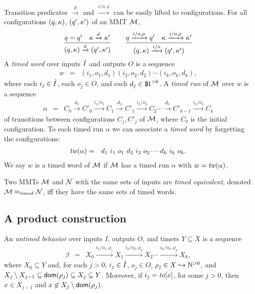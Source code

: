 Transition predicates $\xrightarrow{d}$ and $\xrightarrow{i/o, \rho}$ can be easily lifted to configurations.
For all configurations $(q, \kappa)$, $(q', \kappa')$ of an MMT ${\cal M}$,
\[
\frac{q = q' \quad \kappa \xrightarrow{d} \kappa'}{(q,\kappa) \xrightarrow{d} (q',\kappa')}
\quad\quad
  \frac{q \xrightarrow{i/o,\rho} q' \quad \kappa \xrightarrow{i/o, \rho} \kappa'}{(q,\kappa) \xrightarrow{i/o} (q',\kappa')}
\]
A \emph{timed word} over inputs $\hat{I}$ and outputs $O$ is a sequence
\begin{eqnarray*}
w & = &  (i_1, o_1, d_1) (i_2, o_2, d_2) \cdots (i_k, o_k, d_k),
\end{eqnarray*}
where each $i_j \in \hat{I}$, each $o_j \in O$, and each $d_j \in {\rm I\!R}^{> 0}$.
A \emph{timed run} of ${\cal M}$ over $w$ is a sequence 
\begin{eqnarray*}
\alpha & = & C_0 \xrightarrow{d_1} C'_0 \xrightarrow{i_1/o_1} C_1 \xrightarrow{d_2} C'_1 \xrightarrow{i_2/o_2} C_2 \cdots
\xrightarrow{d_k} C'_{k-1} \xrightarrow{i_k/o_k} C_{k}
\end{eqnarray*}
of transitions between configurations $C_j, C'_j$ of ${\cal M}$, where $C_0$ is the initial configuration.
To each timed run $\alpha$ we can associate a \emph{timed word} by forgetting the configurations:
\begin{eqnarray*}
\mathit{tw}(\alpha) & = & d_1 ~ i_1 ~ o_1 ~ d_2 ~ i_2 ~ o_2 \cdots d_k ~ i_k ~ o_k.
\end{eqnarray*}
We say $w$ is a timed word of ${\cal M}$ if ${\cal M}$ has a timed run $\alpha$ with $w = \mathit{tw}(\alpha)$.

Two MMTs ${\cal M}$ and ${\cal N}$ with the same sets of inputs are \emph{timed equivalent}, denoted ${\cal M} \approx_{\mathit{timed}} {\cal N}$, iff 
they have the same sets of timed words.


\subsection{A product construction}
An \emph{untimed behavior} over inputs $I$, outputs $O$, and timers $Y \subseteq X$ is a sequence 
\begin{eqnarray*}
\beta & = & X_0 \xrightarrow{i_1/o_1, \rho_1} X_1  \xrightarrow{i_2/o_2, \rho_2} X_2 \cdots \xrightarrow{i_k/o_k, \rho_k} X_{k},
\end{eqnarray*}
where $X_0 \subseteq Y$ and, for each $j>0$,  $i_j \in \hat{I}$, $o_j \in O$, $\rho_j \in X \hookrightarrow {\mathbb N}^{>0}$, and
 $X_j \setminus X_{j-1}  \subseteq {\textsf{dom}}(\rho_j) \subseteq X_j \subseteq Y$.
Moreover, if $i_j = \mathit{to}[x]$, for some $j>0$, then $x \in X_{j-1}$ and $x \not\in X_j \setminus {\textsf{dom}}(\rho_j)$.

